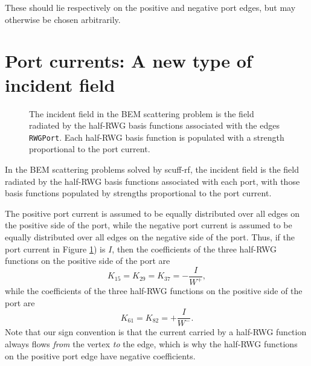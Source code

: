 \documentclass[letterpaper]{article}
\begin{document}
These should lie respectively on the positive and 
negative port edges, but may otherwise be chosen
arbitrarily.

\newpage

\section{Port currents: A new type of incident field}
\label{PortCurrentSection}

\begin{figure}
\begin{center}
\caption{The incident field in the BEM scattering problem
         is the field radiated by the half-RWG basis functions
         associated with the edges \texttt{RWGPort}.
         Each half-RWG basis function is populated with
         a strength proportional to the port current.
        }
\label{PortCurrentFigure}
\end{center}
\end{figure}

In the BEM scattering problems solved by {\sc scuff-rf}, the incident
field is the field radiated by the half-RWG basis functions associated 
with each port, with those basis functions populated by strengths
proportional to the port current.

The positive port current is assumed to be equally distributed over 
all edges on the positive side of the port, while the 
negative port current is assumed to be equally distributed over 
all edges on the negative side of the port.
Thus, if the port current in Figure \ref{PortCurrentFigure}) is $I$, 
then the coefficients of the three half-RWG functions on the 
positive side of the port are
$$K_{15}=K_{29}=K_{37}=-\frac{I}{W^+},$$
while the coefficients of the three half-RWG functions on the 
positive side of the port are
$$K_{61}=K_{82}=+\frac{I}{W^-}.$$
Note that our sign convention is that the current carried
by a half-RWG function always flows \textit{from} the vertex 
\textit{to} the edge, which is why the half-RWG functions
on the positive port edge have negative coefficients.
\end{document}
